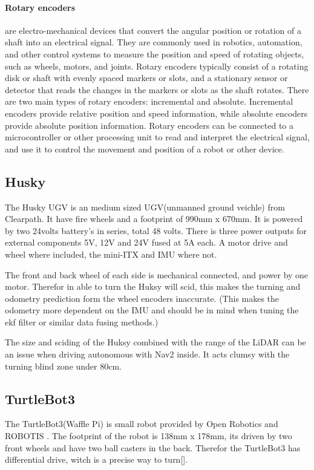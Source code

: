 \paragraph{Rotary encoders} are electro-mechanical devices that convert the angular position or rotation of a shaft into an electrical signal. They are commonly used in robotics, automation, and other control systems to measure the position and speed of rotating objects, such as wheels, motors, and joints. Rotary encoders typically consist of a rotating disk or shaft with evenly spaced markers or slots, and a stationary sensor or detector that reads the changes in the markers or slots as the shaft rotates. There are two main types of rotary encoders: incremental and absolute. Incremental encoders provide relative position and speed information, while absolute encoders provide absolute position information. Rotary encoders can be connected to a microcontroller or other processing unit to read and interpret the electrical signal, and use it to control the movement and position of a robot or other device.

\subsection{Husky}
The Husky UGV \cite{huskyugv} is an medium sized UGV(unmanned ground veichle) from Clearpath. It have fire wheels and a footprint of 990mm x 670mm. It is powered by two 24volts battery's in series, total 48 volts. There is three power outputs for external components 5V, 12V and 24V fused at 5A each. A motor drive and wheel where included, the mini-ITX and IMU where not. 

The front and back wheel of each side is mechanical connected, and power by one motor. Therefor in able to turn the Huksy will scid, this makes the turning and odometry prediction form the wheel encoders inaccurate. 
(This makes the odometry more dependent on the IMU and should be in mind when tuning the ekf filter or similar data fusing methods.) 

The size and sciding of the Huksy combined with the range of the LiDAR can be an issue when driving autonomous with Nav2 inside. It acts clumsy with the turning blind zone under 80cm. 

\subsection{TurtleBot3}
The TurtleBot3(Waffle Pi) is small robot provided by Open Robotics and ROBOTIS \cite{turtlebot3}. The footprint of the robot is 138mm x 178mm, its driven by two front wheels and have two ball casters in the back. Therefor the TurtleBot3 has differential drive, witch is a precise way to turn[]. 

